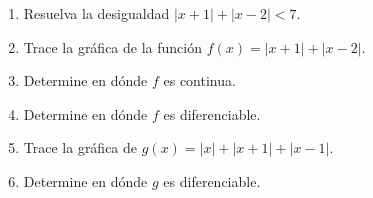 \item \par
\begin{enumerate}
    \item[(a)] Resuelva la desigualdad $|x + 1| + |x - 2| < 7$.
    \item[(b)] Trace la gráfica de la función $f(x) = |x + 1| + |x - 2|$.
    \item[(c)] Determine en dónde $f$ es continua.
    \item[(d)] Determine en dónde $f$ es diferenciable.
    \item[(e)] Trace la gráfica de $g(x) = |x| + |x + 1| + |x - 1|$.
    \item[(f)] Determine en dónde $g$ es diferenciable.
\end{enumerate}
